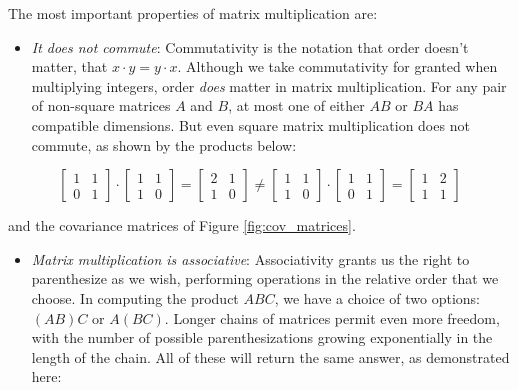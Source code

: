 \documentclass[10pt]{article}
\begin{document}
The most important properties of matrix multiplication are:

\begin{itemize}
  \item \textit{It does not commute}: Commutativity is the notation that order doesn't matter, that $x \cdot y = y \cdot x$. Although we take commutativity for granted when multiplying integers, order \textit{does} matter in matrix multiplication. For any pair of non-square matrices $A$ and $B$, at most one of either $AB$ or $BA$ has compatible dimensions. But even square matrix multiplication does not commute, as shown by the products below:
\end{itemize}

\[
\begin{bmatrix}
1 & 1 \\
0 & 1
\end{bmatrix}
\cdot
\begin{bmatrix}
1 & 1 \\
1 & 0
\end{bmatrix}
=
\begin{bmatrix}
2 & 1 \\
1 & 0
\end{bmatrix}
\neq
\begin{bmatrix}
1 & 1 \\
1 & 0
\end{bmatrix}
\cdot
\begin{bmatrix}
1 & 1 \\
0 & 1
\end{bmatrix}
=
\begin{bmatrix}
1 & 2 \\
1 & 1
\end{bmatrix}
\]

and the covariance matrices of Figure \ref{fig:cov_matrices}.

\begin{itemize}
  \item \textit{Matrix multiplication is associative}: Associativity grants us the right to parenthesize as we wish, performing operations in the relative order that we choose. In computing the product $ABC$, we have a choice of two options: $(AB)C$ or $A(BC)$. Longer chains of matrices permit even more freedom, with the number of possible parenthesizations growing exponentially in the length of the chain. All of these will return the same answer, as demonstrated here:
\end{itemize}
\end{document}
